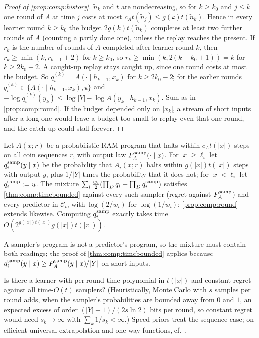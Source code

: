 \begin{proof}[Proof of \cref{prop:comp:history}]
$\tilde n_k$ and $t$ are nondecreasing, so for $k\ge k_0$ and $j\le k$ one round of $A$ at time $j$ costs at most $c_At(\tilde n_j)\le g(k)t(\tilde n_k)$. Hence in every learner round $k\ge k_0$ the budget $2g(k)t(\tilde n_k)$ completes at least two further rounds of $A$ (counting a partly done one), unless the replay reaches the present. If $r_k$ is the number of rounds of $A$ completed after learner round $k$, then $r_k\ge\min(k,r_{k-1}+2)$ for $k\ge k_0$, so $r_k\ge\min(k,2(k-k_0+1))=k$ for $k\ge2k_0-2$. A caught-up replay stays caught up, since one round costs at most the budget. So $q_i^{(k)}=A(\cdot\mid h_{k-1},x_k)$ for $k\ge2k_0-2$; for the earlier rounds $q_i^{(k)}\in\{A(\cdot\mid h_{k-1},x_k),u\}$ and $-\log q_i^{(k)}(y_k)\le\log|Y|-\log A(y_k\mid h_{k-1},x_k)$. Sum as in \cref{prop:comp:round}. If the budget depended only on $|x_k|$, a stream of short inputs after a long one would leave a budget too small to replay even that one round, and the catch-up could stall forever.
\end{proof}

\begin{proposition}[Samplers]\label{prop:comp:samplers}
Let $A(x;r)$ be a probabilistic RAM program that halts within $c_At(|x|)$ steps on all coin sequences $r$, with output law $P^{\rm samp}_A(\cdot\mid x)$. For $|x|\ge\ell_i$ let $q_i^{\rm samp}(y\mid x)$ be the probability that $A_i(x;r)$ halts within $g(|x|)t(|x|)$ steps with output $y$, plus $1/|Y|$ times the probability that it does not; for $|x|<\ell_i$ let $q_i^{\rm samp}:=u$. The mixture $\sum_i\frac{w_i}2(\prod_Dq_i+\prod_Dq_i^{\rm samp})$ satisfies \cref{thm:comp:timebounded} against every such sampler (regret against $P^{\rm samp}_A$) and every predictor in $\mathcal C_t$, with $\log(2/w_i)$ for $\log(1/w_i)$; \cref{prop:comp:round} extends likewise. Computing $q_i^{\rm samp}$ exactly takes time $O(2^{g(|x|)t(|x|)}g(|x|)t(|x|))$.
\end{proposition}

A sampler's program is not a predictor's program, so the mixture must contain both readings; the proof of \cref{thm:comp:timebounded} applies because $q_i^{\rm samp}(y\mid x)\ge P^{\rm samp}_A(y\mid x)/|Y|$ on short inputs.

\begin{question}\label{q:comp:samplers}
Is there a learner with per-round time polynomial in $t(|x|)$ and constant regret against all time-$O(t)$ samplers? (Heuristically, Monte Carlo with $s$ samples per round adds, when the sampler's probabilities are bounded away from $0$ and $1$, an expected excess of order $(|Y|-1)/(2s\ln2)$ bits per round, so constant regret would need $s_k\to\infty$ with $\sum_k1/s_k<\infty$.) Speed priors \citep{schmidhuber2002speed,filan2016loss} treat the sequence case; on efficient universal extrapolation and one-way functions, cf.\ \citet{impagliazzo1990no}.
\end{question}

